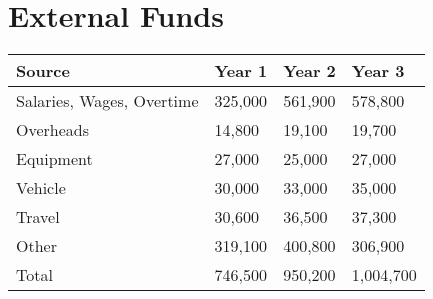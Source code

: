 \documentclass[version=last,
    paper=a4,                               %
    10pt,                                   %
    dvipsnames,
    oneside,                              %
    headings=openany,                       %
    open=any,
    BCOR=7mm,                               %
    DIV=15,     %
]{scrbook}
\begin{document}
\section*{External Funds }



\begin{longtabu} to \linewidth { |  X | X | X | X | }
\hline
{}
Source & Year 1 & Year 2 & Year 3\\
\hline
\endhead



Salaries, Wages, Overtime & 325,000 & 561,900 & 578,800\\



Overheads & 14,800 & 19,100 & 19,700\\



Equipment & 27,000 & 25,000 & 27,000\\



Vehicle & 30,000 & 33,000 & 35,000\\



Travel & 30,600 & 36,500 & 37,300\\



Other & 319,100 & 400,800 & 306,900\\



Total & 746,500 & 950,200 & 1,004,700\\


\hline
\end{longtabu}





\end{document}
